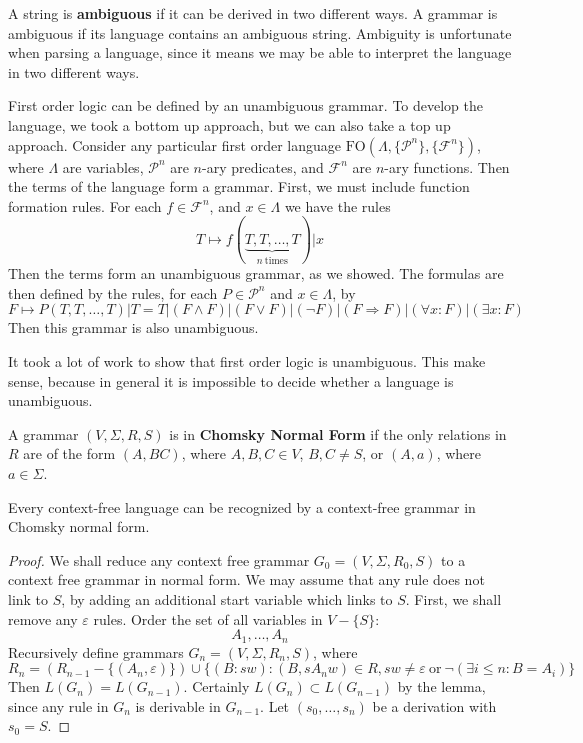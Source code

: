 A string is {\bf ambiguous} if it can be derived in two different ways. A grammar is ambiguous if its language contains an ambiguous string. Ambiguity is unfortunate when parsing a language, since it means we may be able to interpret the language in two different ways.

\begin{example}
    First order logic can be defined by an unambiguous grammar. To develop the language, we took a bottom up approach, but we can also take a top up approach. Consider any particular first order language $\text{FO}(\Lambda, \{ \mathcal{P}^n \}, \{ \mathcal{F}^n \})$, where $\Lambda$ are variables, $\mathcal{P}^n$ are $n$-ary predicates, and $\mathcal{F}^n$ are $n$-ary functions. Then the terms of the language form a grammar. First, we must include function formation rules. For each $f \in \mathcal{F}^n$, and $x \in \Lambda$ we have the rules
    \[ T \mapsto f(\underbrace{T, T, \dots, T}_{n\ \text{times}}) | x \]
    Then the terms form an unambiguous grammar, as we showed. The formulas are then defined by the rules, for each $P \in \mathcal{P}^n$ and $x \in \Lambda$, by
    \[ F \mapsto P(T, T, \dots, T) | T = T | (F \wedge F) | (F \vee F) | (\neg F) | (F \Rightarrow F) | (\forall x: F) | (\exists x: F) \]
    Then this grammar is also unambiguous.
\end{example}

It took a lot of work to show that first order logic is unambiguous. This make sense, because in general it is impossible to decide whether a language is unambiguous.

\begin{definition}
    A grammar $(V,\Sigma,R,S)$ is in {\bf Chomsky Normal Form} if the only relations in $R$ are of the form $(A,BC)$, where $A,B,C \in V$, $B,C \neq S$, or $(A,a)$, where $a \in \Sigma$.
\end{definition}

\begin{theorem}
    Every context-free language can be recognized by a context-free grammar in Chomsky normal form.
\end{theorem}
\begin{proof}
    We shall reduce any context free grammar $G_0 = (V,\Sigma,R_0,S)$ to a context free grammar in normal form. We may assume that any rule does not link to $S$, by adding an additional start variable which links to $S$. First, we shall remove any $\varepsilon$ rules. Order the set of all variables in $V - \{ S \}$:
    \[ A_1, \dots, A_n \]
    Recursively define grammars $G_n = (V,\Sigma,R_n,S)$, where
    \[ R_n = \left( R_{n-1} - \{ (A_n, \varepsilon) \} \right) \cup \{ (B: sw) : (B,sA_nw) \in R, sw \neq \varepsilon\ \text{or}\ \neg (\exists i \leq n : B = A_i) \} \]
    Then $L(G_n) = L(G_{n-1})$. Certainly $L(G_n) \subset L(G_{n-1})$ by the lemma, since any rule in $G_n$ is derivable in $G_{n-1}$. Let $(s_0, \dots, s_n)$ be a derivation with $s_0 = S$.
\end{proof}

